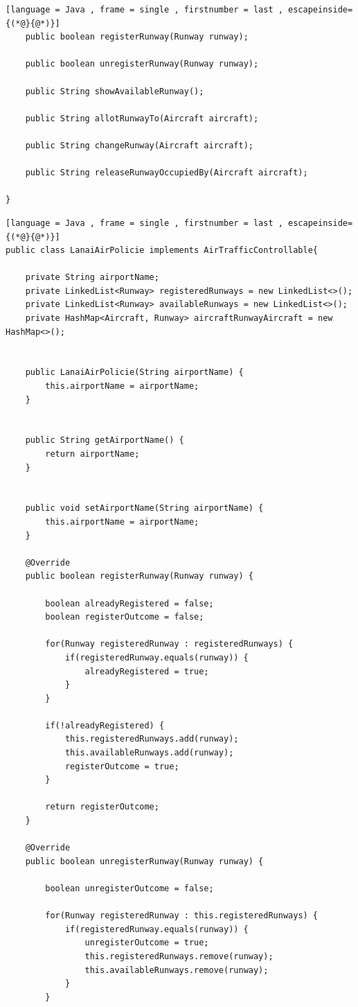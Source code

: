 \documentclass{article}
\begin{document}
\begin{sloppy}
\begin{lstlisting}[language = Java , frame = single , firstnumber = last , escapeinside={(*@}{@*)}]
	public boolean registerRunway(Runway runway);
	
	public boolean unregisterRunway(Runway runway);
	
	public String showAvailableRunway();
	
	public String allotRunwayTo(Aircraft aircraft);
	
	public String changeRunway(Aircraft aircraft);
	
	public String releaseRunwayOccupiedBy(Aircraft aircraft);
	
}

\end{lstlisting}

\begin{lstlisting}[language = Java , frame = single , firstnumber = last , escapeinside={(*@}{@*)}]
public class LanaiAirPolicie implements AirTrafficControllable{

	private String airportName;
	private LinkedList<Runway> registeredRunways = new LinkedList<>();
	private LinkedList<Runway> availableRunways = new LinkedList<>();
	private HashMap<Aircraft, Runway> aircraftRunwayAircraft = new HashMap<>();
	
	
	public LanaiAirPolicie(String airportName) {
		this.airportName = airportName;
	}
	
	
	public String getAirportName() {
		return airportName;
	}


	public void setAirportName(String airportName) {
		this.airportName = airportName;
	}

	@Override
	public boolean registerRunway(Runway runway) {
		
		boolean alreadyRegistered = false;
		boolean registerOutcome = false;
		
		for(Runway registeredRunway : registeredRunways) {
			if(registeredRunway.equals(runway)) {
				alreadyRegistered = true;
			}
		}
		
		if(!alreadyRegistered) {
			this.registeredRunways.add(runway);
			this.availableRunways.add(runway);
			registerOutcome = true;
		}
		
		return registerOutcome;
	}

	@Override
	public boolean unregisterRunway(Runway runway) {
		
		boolean unregisterOutcome = false;
		
		for(Runway registeredRunway : this.registeredRunways) {
			if(registeredRunway.equals(runway)) {
				unregisterOutcome = true;
				this.registeredRunways.remove(runway);
				this.availableRunways.remove(runway);
			}
		}
		

\end{lstlisting}
\end{sloppy}
\end{document}
